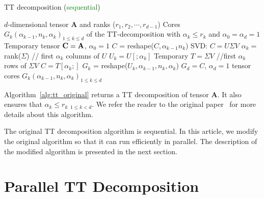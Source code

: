 \documentclass[runningheads]{llncs}
\newcommand{\tensor}[1]{\cal\textbf{#1}\xspace}
\begin{document}
\begin{algorithm}[htb]
	\caption{\label{alg:tt_original}TT decomposition (\textcolor{green}{sequential})}
	\begin{algorithmic}[1]
		\REQUIRE $d$-dimensional tensor \tensor{A} and ranks ($r_1, r_2,\cdots, r_{d-1}$) 
		\ENSURE Cores $G_k(\alpha_{k-1}, n_k, \alpha_k) _{1\le k\le d}$ of the TT-decomposition with $\alpha_k \le r_k$ and $\alpha_0 = \alpha_d=1$
		\STATE Temporary tensor $\tensor{C}=\tensor{A}$, $\alpha_0=1$
		\STATE $C$ =  reshape($C, \alpha_{k-1} n_k$) 
		\STATE SVD: $C=U \Sigma V$
		\STATE $\alpha_k=$ rank($\Sigma$)
		\STATE // first $\alpha_k$ columns of $U$
		\STATE $U_k = U[;\alpha_k]$
		\STATE Temporary $T =\Sigma V$
		\STATE //first $\alpha_k$ rows of $\Sigma V$
		\STATE $C= T[\alpha_k;]$
		\STATE $G_k$ = reshape($U_k, \alpha_{k-1}, n_k, \alpha_k$)
		\ENDFOR
		\STATE $G_d = C$, $\alpha_d=1$
		\RETURN tensor cores $G_k(\alpha_{k-1}, n_k, \alpha_k) _{1\le k\le d}$
	\end{algorithmic}
\end{algorithm}

Algorithm~\ref{alg:tt_original} returns a TT decomposition of tensor \tensor{A}. It also ensures that $\alpha_k \le r_k$ $_{1\le k < d}$. We refer the reader to the original paper~\cite{tt} for more details about this algorithm. 

The original TT decomposition algorithm is sequential. In this article, we modify the original algorithm so that it can run efficiently in parallel. The description of the modified algorithm is presented in the next section.

\section{Parallel TT Decomposition}
\label{sec:tt_parallel}
\end{document}
